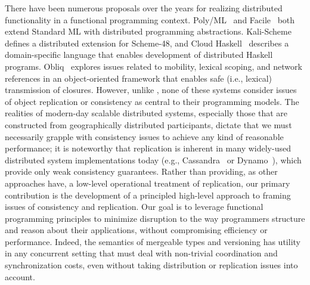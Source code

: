 There have been numerous proposals over the years for realizing
distributed functionality in a functional programming context.
Poly/ML~\cite{Mat97} and Facile~\cite{TLK+93} both extend Standard ML
with distributed programming abstractions.  Kali-Scheme~\cite{CJK95}
defines a distributed extension for Scheme-48, and Cloud
Haskell~\cite{EBPJ11} describes a domain-specific language that
enables development of distributed Haskell programs.
Obliq~\cite{Car95} explores issues related to mobility, lexical
scoping, and network references in an object-oriented framework that
enables safe (i.e., lexical) transmission of closures.  However,
unlike \name, none of these systems consider issues of object
replication or consistency as central to their programming models.
The realities of modern-day scalable distributed systems, especially
those that are constructed from geographically distributed
participants, dictate that we must necessarily grapple with
consistency issues to achieve any kind of reasonable performance; it
is noteworthy that replication is inherent in many widely-used
distributed system implementations today (e.g.,
Cassandra~\cite{Cassandra} or Dynamo~\cite{Dynamo}), which provide
only weak consistency guarantees.  Rather than providing, as other
approaches have, a low-level operational treatment of replication, our
primary contribution is the development of a principled high-level
approach to framing issues of consistency and replication.  Our goal
is to leverage functional programming principles to minimize
disruption to the way programmers structure and reason about their
applications, without compromising efficiency or performance.  Indeed,
the semantics of mergeable types and versioning has utility in any
concurrent setting that must deal with non-trivial coordination and
synchronization costs, even without taking distribution or replication
issues into account.
